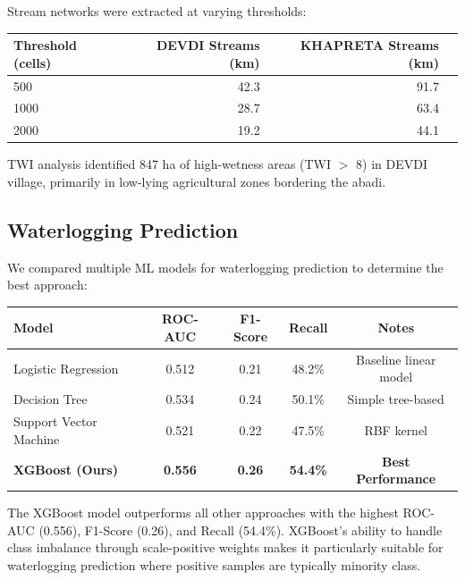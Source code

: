 \documentclass[a4paper,12pt]{article}
\begin{document}
Stream networks were extracted at varying thresholds:

\begin{longtable}{lrrr}
	\toprule
	\textbf{Threshold (cells)} & \textbf{DEVDI Streams (km)} & \textbf{KHAPRETA Streams (km)} \\
	\midrule
	500                        & 42.3                        & 91.7                           \\
	1000                       & 28.7                        & 63.4                           \\
	2000                       & 19.2                        & 44.1                           \\
	\bottomrule
\end{longtable}

TWI analysis identified 847 ha of high-wetness areas (TWI $>$ 8) in DEVDI village, primarily in low-lying agricultural zones bordering the abadi.

\subsection{Waterlogging Prediction}

We compared multiple ML models for waterlogging prediction to determine the best approach:

{\small
\begin{table}[H]
	\centering
	\begin{tabular}{|l|c|c|c|c|}
		\hline
		\textbf{Model}          & \textbf{ROC-AUC} & \textbf{F1-Score} & \textbf{Recall} & \textbf{Notes}            \\
		\hline
		Logistic Regression     & 0.512            & 0.21              & 48.2\%          & Baseline linear model     \\
		\hline
		Decision Tree           & 0.534            & 0.24              & 50.1\%          & Simple tree-based         \\
		\hline
		Support Vector Machine  & 0.521            & 0.22              & 47.5\%          & RBF kernel                \\
		\hline
		\textbf{XGBoost (Ours)} & \textbf{0.556}   & \textbf{0.26}     & \textbf{54.4\%} & \textbf{Best Performance} \\
		\hline
	\end{tabular}
\end{table}
}

\bigskip

The XGBoost model outperforms all other approaches with the highest ROC-AUC (0.556), F1-Score (0.26), and Recall (54.4\%). XGBoost's ability to handle class imbalance through scale-positive weights makes it particularly suitable for waterlogging prediction where positive samples are typically minority class.
\end{document}
